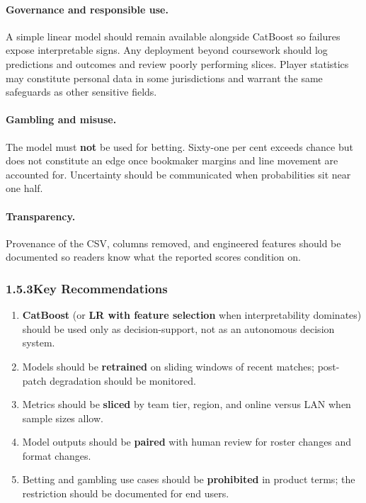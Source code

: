 \documentclass[12pt,a4paper]{article}
\begin{document}
\paragraph{Governance and responsible use.}
A simple linear model should remain available alongside CatBoost so failures expose interpretable signs. Any deployment beyond coursework should log predictions and outcomes and review poorly performing slices. Player statistics may constitute personal data in some jurisdictions and warrant the same safeguards as other sensitive fields.

\paragraph{Gambling and misuse.}
The model must \textbf{not} be used for betting. Sixty-one per cent exceeds chance but does not constitute an edge once bookmaker margins and line movement are accounted for. Uncertainty should be communicated when probabilities sit near one half.

\paragraph{Transparency.}
Provenance of the CSV, columns removed, and engineered features should be documented so readers know what the reported scores condition on.

\subsubsection{1.5.3\quad Key Recommendations}

\begin{enumerate}[leftmargin=1.5em]
    \item \textbf{CatBoost} (or \textbf{LR with feature selection} when interpretability dominates) should be used only as decision-support, not as an autonomous decision system.
    \item Models should be \textbf{retrained} on sliding windows of recent matches; post-patch degradation should be monitored.
    \item Metrics should be \textbf{sliced} by team tier, region, and online versus LAN when sample sizes allow.
    \item Model outputs should be \textbf{paired} with human review for roster changes and format changes.
    \item Betting and gambling use cases should be \textbf{prohibited} in product terms; the restriction should be documented for end users.
\end{enumerate}
\end{document}

